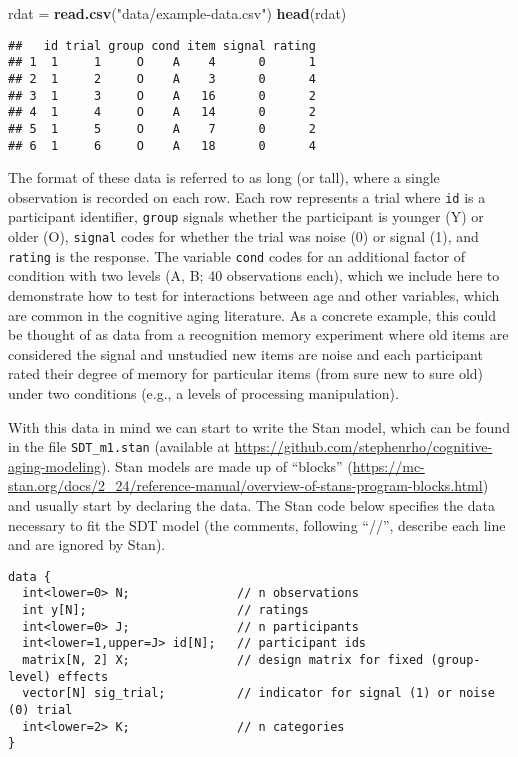 \documentclass[
  english,
  ,man,floatsintext]{apa6}
\newenvironment{Shaded}{\begin{snugshade}}{\end{snugshade}}
\newcommand{\KeywordTok}[1]{\textcolor[rgb]{0.13,0.29,0.53}{\textbf{#1}}}
\newcommand{\NormalTok}[1]{#1}
\newcommand{\StringTok}[1]{\textcolor[rgb]{0.31,0.60,0.02}{#1}}
\begin{document}
\begin{Shaded}
\begin{Highlighting}[]
\NormalTok{rdat =}\StringTok{ }\KeywordTok{read.csv}\NormalTok{(}\StringTok{"data/example-data.csv"}\NormalTok{)}
\KeywordTok{head}\NormalTok{(rdat)}
\end{Highlighting}
\end{Shaded}

\begin{verbatim}
##   id trial group cond item signal rating
## 1  1     1     O    A    4      0      1
## 2  1     2     O    A    3      0      4
## 3  1     3     O    A   16      0      2
## 4  1     4     O    A   14      0      2
## 5  1     5     O    A    7      0      2
## 6  1     6     O    A   18      0      4
\end{verbatim}

The format of these data is referred to as long (or tall), where a single observation is recorded on each row. Each row represents a trial where \texttt{id} is a participant identifier, \texttt{group} signals whether the participant is younger (Y) or older (O), \texttt{signal} codes for whether the trial was noise (0) or signal (1), and \texttt{rating} is the response. The variable \texttt{cond} codes for an additional factor of condition with two levels (A, B; 40 observations each), which we include here to demonstrate how to test for interactions between age and other variables, which are common in the cognitive aging literature. As a concrete example, this could be thought of as data from a recognition memory experiment where old items are considered the signal and unstudied new items are noise and each participant rated their degree of memory for particular items (from sure new to sure old) under two conditions (e.g., a levels of processing manipulation).

With this data in mind we can start to write the Stan model, which can be found in the file \texttt{SDT\_m1.stan} (available at \url{https://github.com/stephenrho/cognitive-aging-modeling}). Stan models are made up of \enquote{blocks} (\url{https://mc-stan.org/docs/2_24/reference-manual/overview-of-stans-program-blocks.html}) and usually start by declaring the data. The Stan code below specifies the data necessary to fit the SDT model (the comments, following \enquote{//}, describe each line and are ignored by Stan).

\begin{verbatim}
data {
  int<lower=0> N;               // n observations
  int y[N];                     // ratings
  int<lower=0> J;               // n participants
  int<lower=1,upper=J> id[N];   // participant ids
  matrix[N, 2] X;               // design matrix for fixed (group-level) effects
  vector[N] sig_trial;          // indicator for signal (1) or noise (0) trial
  int<lower=2> K;               // n categories
}
\end{verbatim}
\end{document}
